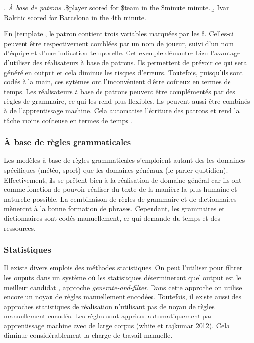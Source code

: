 \ex. \label{template} \emph{À base de patrons}
	\a.\$player scored for \$team in the \$minute minute. 
	\b. Ivan Rakitic scored for Barcelona in the 4th minute.

En \ref{template}, le patron contient trois variables marquées par les \$. Celles-ci peuvent être respectivement comblées par un nom de joueur, suivi d'un nom d'équipe et d'une indication temporelle. Cet exemple démontre bien l'avantage d'utiliser des réalisateurs à base de patrons. Ils permettent de prévoir ce qui sera généré en output et cela diminue les risques d'erreurs. Toutefois, puisqu'ils sont codés à la main, ces sytèmes ont l'inconvénient d'être coûteux en termes de temps. Les réalisateurs à base de patrons peuvent être complémentés par des règles de grammaire, ce qui les rend plus flexibles. Ils peuvent aussi être combinés à de l'apprentissage machine. Cela automatise l'écriture des patrons et rend la tâche moins coûteuse en termes de temps \citep{gatt18}.

\subsubsection{À base de règles grammaticales}
Les modèles à base de règles grammaticales s'emploient autant des les domaines spécifiques (météo, sport) que les domaines généraux (le parler quotidien). Effectivement, ils se prêtent bien à la réalisation de domaine général car ils ont comme fonction de pouvoir réaliser du texte de la manière la plus humaine et naturelle possible. La combinaison de règles de grammaire et de dictionnaires mèneront à la bonne formation de phrases. Cependant, les grammaires et dictionnaires sont codés manuellement, ce qui demande du temps et des ressources.

\subsubsection{Statistiques}
Il existe divers emplois des méthodes statistiques. On peut l'utiliser pour filtrer les ouputs dans un système où les statisitques détermineront quel output est le meilleur candidat \citep{LangkildeForestbasedStatisticalSentence2000}, approche \emph{generate-and-filter}. Dans cette approche on utilise encore un noyau de règles manuellement encodées. Toutefois, il existe aussi des approches statistiques de réalisation n'utilisant pas de noyau de règles manuellement encodés. Les règles sont apprises automatiquement par apprentissage machine avec de large corpus (white et rajkumar 2012). Cela diminue considérablement la charge de travail manuelle.

